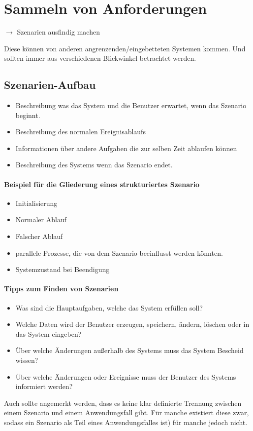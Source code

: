 \documentclass[parskip=full]{scrartcl}
\begin{document}
\section{Sammeln von Anforderungen}
$\rightarrow$ Szenarien ausfindig machen

Diese können von anderen angrenzenden/eingebetteten Systemen kommen. Und sollten immer aus verschiedenen Blickwinkel betrachtet werden.
\subsection{Szenarien-Aufbau}
\begin{itemize}
	\item Beschreibung was das System und die Benutzer erwartet, wenn das Szenario beginnt.
	\item Beschreibung des normalen Ereignisablaufs
	\item Informationen über andere Aufgaben die zur selben Zeit ablaufen können
	\item Beschreibung des Systems wenn das Szenario endet.
\end{itemize}
\paragraph{Beispiel für die Gliederung eines strukturiertes Szenario}
\begin{itemize}
	\item Initialisierung
	\item Normaler Ablauf
	\item Falscher Ablauf
	\item parallele Prozesse, die von dem Szenario beeinflusst werden könnten.
	\item Systemzustand bei Beendigung
\end{itemize}
\paragraph{Tipps zum Finden von Szenarien}
\begin{itemize}
	\item Was sind die Hauptaufgaben, welche das System erfüllen soll?
	\item Welche Daten wird der Benutzer erzeugen, speichern, ändern, löschen oder in das System eingeben?
	\item Über welche Änderungen außerhalb des Systems muss das
	System Bescheid wissen?
	\item Über welche Änderungen oder Ereignisse muss der Benutzer des Systems informiert werden?
\end{itemize}
Auch sollte angemerkt werden, dass es keine klar definierte Trennung zwischen einem Szenario und einem Anwendungsfall gibt. Für manche existiert diese zwar, sodass ein Szenario als Teil eines Anwendungsfalles ist) für manche jedoch nicht.
\end{document}
